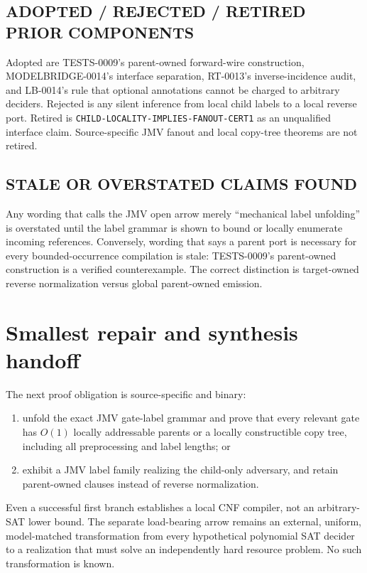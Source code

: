 \documentclass[11pt]{article}
\begin{document}
\subsection*{ADOPTED / REJECTED / RETIRED PRIOR COMPONENTS}
Adopted are TESTS-0009's parent-owned forward-wire construction,
MODELBRIDGE-0014's interface separation, RT-0013's inverse-incidence audit,
and LB-0014's rule that optional annotations cannot be charged to arbitrary
deciders.  Rejected is any silent inference from local child labels to a
local reverse port.  Retired is
\texttt{CHILD-LOCALITY-IMPLIES-FANOUT-CERT1} as an unqualified interface
claim.  Source-specific JMV fanout and local copy-tree theorems are not
retired.

\subsection*{STALE OR OVERSTATED CLAIMS FOUND}
Any wording that calls the JMV open arrow merely ``mechanical label
unfolding'' is overstated until the label grammar is shown to bound or
locally enumerate incoming references.  Conversely, wording that says a
parent port is necessary for every bounded-occurrence compilation is stale:
TESTS-0009's parent-owned construction is a verified counterexample.  The
correct distinction is target-owned reverse normalization versus global
parent-owned emission.

\section{Smallest repair and synthesis handoff}

The next proof obligation is source-specific and binary:
\begin{enumerate}
\item unfold the exact JMV gate-label grammar and prove that every relevant
gate has $O(1)$ locally addressable parents or a locally constructible copy
tree, including all preprocessing and label lengths; or
\item exhibit a JMV label family realizing the child-only adversary, and
retain parent-owned clauses instead of reverse normalization.
\end{enumerate}
Even a successful first branch establishes a local CNF compiler, not an
arbitrary-SAT lower bound.  The separate load-bearing arrow remains an
external, uniform, model-matched transformation from every hypothetical
polynomial SAT decider to a realization that must solve an independently
hard resource problem.  No such transformation is known.
\end{document}
